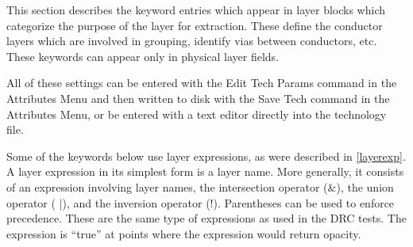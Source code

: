 This section describes the keyword entries which appear in layer
blocks which categorize the purpose of the layer for extraction. 
These define the conductor layers which are involved in grouping,
identify vias between conductors, etc.  These keywords can appear only
in physical layer fields.

All of these settings can be entered with the {\cb Edit Tech Params}
command in the {\cb Attributes Menu} and then written to disk with the
{\cb Save Tech} command in the {\cb Attributes Menu}, or be entered
with a text editor directly into the technology file.

Some of the keywords below use layer expressions, as were described in
\ref{layerexp}.  A layer expression in its simplest form is a layer
name.  More generally, it consists of an expression involving layer
names, the intersection operator ({\vt \&}), the union operator ({\vt
|}), and the inversion operator ({\vt !}).  Parentheses can be used to
enforce precedence.  These are the same type of expressions as used in
the DRC tests.  The expression is ``true'' at points where the
expression would return opacity.

